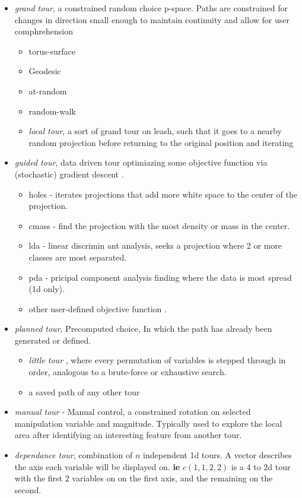 \documentclass{monashthesis}
\begin{document}
\begin{itemize}
\item
  \emph{grand tour}, a constrained random choice p-space. Paths are
  constrained for changes in direction small enough to maintain
  continuity and allow for user comphrehension

  \begin{itemize}
  \tightlist
  \item
    torus-surface \autocite{asimov_grand_1985}
  \item
    Geodesic
  \item
    at-random
  \item
    random-walk
  \item
    \emph{local tour}, a sort of grand tour on leash, such that it goes
    to a nearby random projection before returning to the original
    position and iterating
  \end{itemize}
\item
  \emph{guided tour}, data driven tour optimiazing some objective
  function via (stochastic) gradient descent
  \autocite{hurley_analyzing_1990}.

  \begin{itemize}
  \tightlist
  \item
    holes \autocite{cook_projection_1993} - iterates projections that
    add more white space to the center of the projection.
  \item
    cmass \autocite{cook_projection_1993} - find the projection with the
    most density or mass in the center.
  \item
    lda \autocite{lee_projection_2005} - linear discrimin ant analysis,
    seeks a projection where 2 or more classes are most separated.
  \item
    pda - pricipal component analysis finding where the data is most
    spread (1d only).
  \item
    other user-defined objective function \autocite{wickham_tourr_2011}.
  \end{itemize}
\item
  \emph{planned tour}, Precomputed choice, In which the path has already
  been generated or defined.

  \begin{itemize}
  \tightlist
  \item
    \emph{little tour} \autocite{mcdonald_interactive_1982}, where every
    permutation of variables is stepped through in order, analogous to a
    brute-force or exhaustive search.
  \item
    a saved path of any other tour
  \end{itemize}
\item
  \emph{manual tour} - Manual control, a constrained rotation on
  selected manipulation variable and
  magnitude\autocite{cook_manual_1997}. Typically used to explore the
  local area after identifying an interesting feature from another tour.
\item
  \emph{dependance tour}, combination of \(n\) independent 1d tours. A
  vector describes the axis each variable will be displayed on.
  \textbf{ie} \(c(1, 1, 2, 2)\) is a 4 to 2d tour with the first 2
  variables on on the first axis, and the remaining on the second.


\end{itemize}
\end{document}
